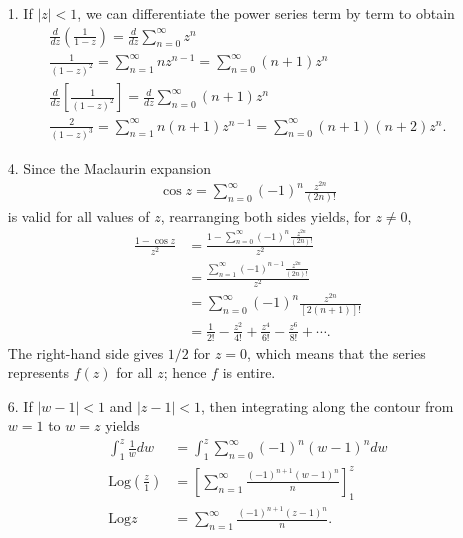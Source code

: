 \documentclass[a4paper,12pt]{article}
\begin{document}
\begin{enumerate}
    \item[1.]
        If $|z| < 1$, we can differentiate the power series term by term to obtain
        \begin{gather*}
            \frac{d}{dz} \left( \frac{1}{1 - z} \right) = \frac{d}{dz} \sum_{n = 0}^\infty z^n \\
            \frac{1}{(1 - z)^2} = \sum_{n = 1}^\infty n z^{n - 1} = \sum_{n = 0}^\infty (n + 1) z^n \\
            \frac{d}{dz} \left[ \frac{1}{(1 - z)^2} \right] = \frac{d}{dz} \sum_{n = 0}^\infty (n + 1) z^n \\
            \frac{2}{(1 - z)^3} = \sum_{n = 1}^\infty n(n + 1) z^{n - 1} = \sum_{n = 0}^\infty (n + 1)(n + 2) z^n.
        \end{gather*}

    \item[4.]
        Since the Maclaurin expansion
        \begin{align*}
            \cos z = \sum_{n = 0}^\infty (-1)^n \frac{z^{2n}}{(2n)!}
        \end{align*}
        is valid for all values of $z$, rearranging both sides yields, for $z \neq 0$,
        \begin{align*}
            \frac{1 - \cos z}{z^2} &= \frac{1 - \sum_{n = 0}^\infty (-1)^n \frac{z^{2n}}{(2n)!}}{z^2} \\
            &= \frac{\sum_{n = 1}^\infty (-1)^{n - 1} \frac{z^{2n}}{(2n)!}}{z^2} \\
            &= \sum_{n = 0}^\infty (-1)^n \frac{z^{2n}}{[2(n + 1)]!} \\
            &= \frac{1}{2!} - \frac{z^2}{4!} + \frac{z^4}{6!} - \frac{z^6}{8!} + \cdots.
        \end{align*}
        The right-hand side gives $1/2$ for $z = 0$, which means that the series represents $f(z)$ for all $z$; hence $f$ is entire.

    \item[6.]
        If $|w - 1| < 1$ and $|z - 1| < 1$, then integrating along the contour from $w = 1$ to $w = z$ yields
        \begin{align*}
            \int_1^z \frac{1}{w} dw &= \int_1^z \sum_{n = 0}^\infty (-1)^n (w - 1)^n dw \\
            \text{Log} \left( \frac{z}{1} \right) &= \left[ \sum_{n = 1}^\infty \frac{(-1)^{n + 1} (w - 1)^n}{n} \right]_1^z \\
            \text{Log} z &= \sum_{n = 1}^\infty \frac{(-1)^{n + 1} (z - 1)^n}{n}.
        \end{align*}


\end{enumerate}
\end{document}
